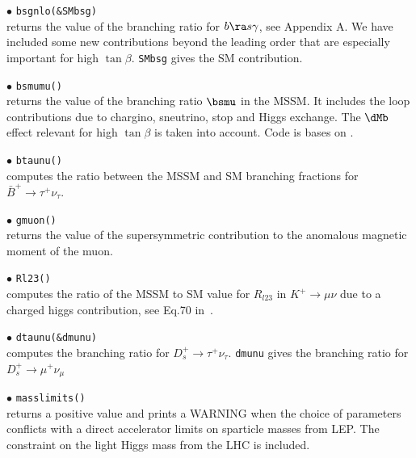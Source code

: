 \documentclass[12pt,a4paper]{article}
\begin{document}
\noi$\bullet$ \verb|bsgnlo(&SMbsg)|\\ returns the value of the branching ratio for  $b\ra s\gamma$, see Appendix A. 
We have included some new contributions beyond the leading order that are
especially important for high $\tan\beta$. \verb|SMbsg| gives the SM contribution.

\noi$\bullet$ \verb|bsmumu()|\\ returns the value of the branching ratio $\bsmu$ in the
MSSM. It includes the loop contributions
due to chargino, sneutrino, stop and Higgs exchange. The $\dMb$ 
effect relevant for high $\tan \beta$ is taken into account. Code is bases on \cite{Bobeth:2001sq}.

\noi$\bullet$ \verb|btaunu()|\\
computes the ratio between the MSSM and SM branching fractions for $\bar{B}^+\rightarrow\tau^+\nu_\tau$. 


\noi$\bullet$ \verb|gmuon()|\\
returns the value of the supersymmetric contribution to the
anomalous magnetic moment of the muon.

\noi$\bullet$ \verb|Rl23()|\\
computes the ratio of the MSSM to SM value for $R_{l23}$ in $K^+\rightarrow \mu\nu$  due to a  charged higgs contribution, see Eq.70 in~\cite{Belanger:2013oya}. 

\noi$\bullet$ \verb|dtaunu(&dmunu)|\\
computes the branching ratio  for ${D}_s^+\rightarrow\tau^+\nu_\tau$. \verb|dmunu| 
gives  the branching ratio  for ${D}_s^+\rightarrow\mu^+\nu_\mu$

 
\noi$\bullet$ \verb|masslimits()|\\
returns a positive value  and
 prints a WARNING when the choice of parameters conflicts with a
direct accelerator limits on sparticle masses from LEP.
The constraint on the light Higgs mass from the LHC is included.  

\end{document}

